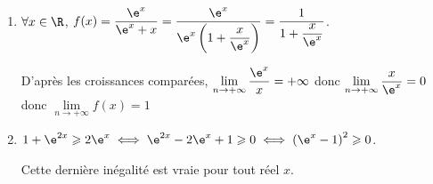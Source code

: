 \begin{enumerate}
Le trinôme du second degré s'annule donc deux fois et change donc aussi de signe.

\hfill {}
	\item $\forall x \in \R$, $f(x)=\dfrac{\e^x}{\e^x+x}=\dfrac{\e^x}{\e^x\left(1+\dfrac{x}{\e^x}\right)}=\dfrac{1}{1+\dfrac{x}{\e^x}}$.

D'après les croissances comparées, $\lim \limits_{n \rightarrow +\infty} \dfrac{\e^x}{x}=+\infty$ donc $\lim \limits_{n \rightarrow +\infty} \dfrac{x}{\e^x}=0$ donc $\lim \limits_{n \rightarrow +\infty} f(x)=1$

\hfill {}
		\item $1+\e^{2x}\geqslant 2\e^x \iff \e^{2x}-2\e^x+1\geqslant0 \iff \left(\e^x-1\right)^2\geqslant0$.

Cette dernière inégalité est vraie pour tout réel $x$.
\hfill {}
\end{enumerate}
